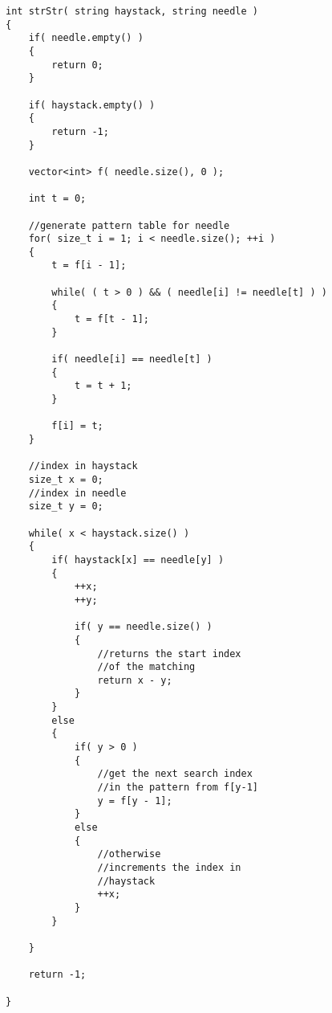 \setcounter{lstlisting}{0}
\begin{lstlisting}[style=customc, caption={KMP}]
int strStr( string haystack, string needle )
{
    if( needle.empty() )
    {
        return 0;
    }

    if( haystack.empty() )
    {
        return -1;
    }

    vector<int> f( needle.size(), 0 );

    int t = 0;

    //generate pattern table for needle
    for( size_t i = 1; i < needle.size(); ++i )
    {
        t = f[i - 1];

        while( ( t > 0 ) && ( needle[i] != needle[t] ) )
        {
            t = f[t - 1];
        }

        if( needle[i] == needle[t] )
        {
            t = t + 1;
        }

        f[i] = t;
    }

    //index in haystack
    size_t x = 0;
    //index in needle
    size_t y = 0;

    while( x < haystack.size() )
    {
        if( haystack[x] == needle[y] )
        {
            ++x;
            ++y;

            if( y == needle.size() )
            {
                //returns the start index
                //of the matching
                return x - y;
            }
        }
        else
        {
            if( y > 0 )
            {
                //get the next search index
                //in the pattern from f[y-1]
                y = f[y - 1];
            }
            else
            {
                //otherwise
                //increments the index in
                //haystack
                ++x;
            }
        }

    }

    return -1;

}
\end{lstlisting}